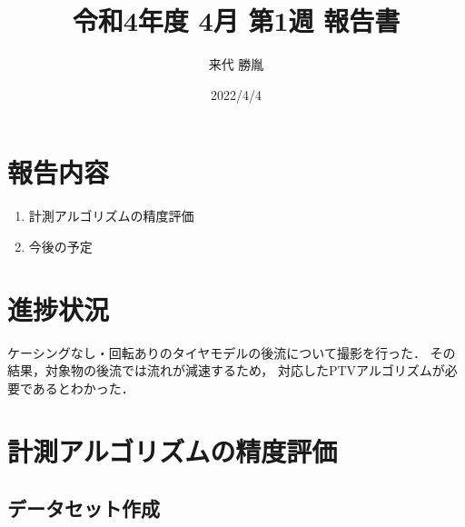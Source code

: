 \documentclass[twocolumn,a4j]{jsarticle}
\author{来代 勝胤}
\title{令和4年度 4月 第1週 報告書}
\date{2022/4/4}
\begin{document}
\columnseprule=0.1mm
\maketitle

\section*{報告内容}
\begin{enumerate}[1.]
  \item 計測アルゴリズムの精度評価
  \item 今後の予定
\end{enumerate}

\section*{進捗状況}
ケーシングなし・回転ありのタイヤモデルの後流について撮影を行った．
その結果，対象物の後流では流れが減速するため，
対応したPTVアルゴリズムが必要であるとわかった．

\section{計測アルゴリズムの精度評価}
\subsection{データセット作成}
\end{document}
